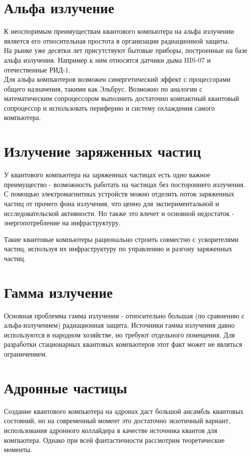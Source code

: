 \documentclass[11pt]{report}
\begin{document}
\section{Альфа излучение}
К неоспоримым преимуществам квантового компьютера на альфа излучении является его относительная простота в организации радиационной защиты.\\
На рынке уже десятки лет присутствуют бытовые приборы, построенные на базе альфа излучения. Например к ним относятся датчики дыма HIS-07 и отечественные РИД-1. \\

Для альфа компьютеров возможен синергетический эффект с процессорами общего назначения, такими как Эльбрус. Возможно по аналогии с математическим сопроцессором выполнить достаточно компактный квантовый сопроцессор и использовать периферию и систему охлаждения самого компьютера. \\

\section{Излучение заряженных частиц}
У квантового компьютера на заряженных частицах есть одно важное преимущество - возможность работать на частицах без постороннего излучения. С помощью электромагнитных устройств можно отделить поток заряженных частиц от прочего фона излучения, что ценно для экспериментальной и исследовательской активности. Но также это влечет и основной недостаток - энергопотребление на инфраструктуру.

Такие квантовые компьютеры рационально строить совместно с ускорителями частиц, используя их инфраструктуру по управлению и разгону заряженных частиц.

\section{Гамма излучение}
Основная проблемма гамма излучения - относительно большая (по сравнению с альфа-излучением) радиационная защита. Источники гамма излучения давно используются в народном хозяйстве, но требуют отдельного помещения. Для разработки стационарных квантовых компьютеров этот факт может не являться ограничением.

\section{Адронные частицы}
Создание квантового компьютера на адронах даст большой ансамбль квантовых состояний, но на современный момент это достаточно экзотичный вариант, использования адронного коллайдера в качестве источника квантов для компьютера. Однако при всей фантастичности рассмотрим теоретические моменты. \\
\end{document}

